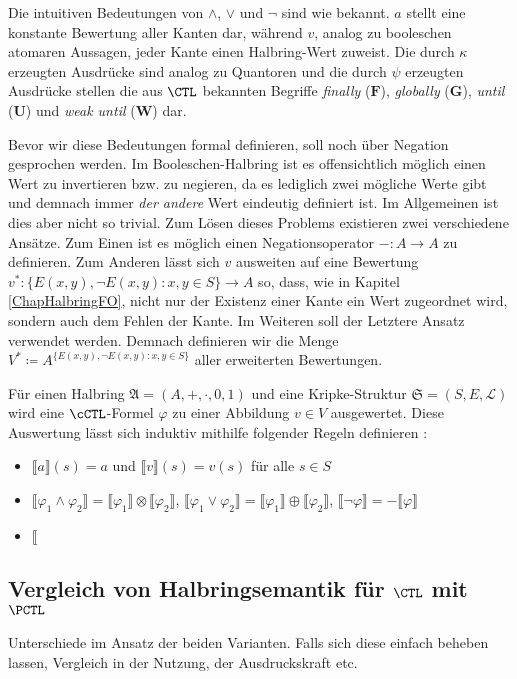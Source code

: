 Die intuitiven Bedeutungen von $\land$, $\lor$ und $\neg$ sind wie bekannt.
$a$ stellt eine konstante Bewertung aller Kanten dar, während $v$, analog zu booleschen atomaren Aussagen, jeder Kante einen Halbring-Wert zuweist.
Die durch $\kappa$ erzeugten Ausdrücke sind analog zu Quantoren und die durch $\psi$ erzeugten Ausdrücke stellen die aus $\CTL$ bekannten Begriffe \textit{finally} ($\boldsymbol{F}$), \textit{globally} ($\boldsymbol{G}$), \textit{until} ($\boldsymbol{U}$) und \textit{weak until} ($\boldsymbol{W}$) dar.

Bevor wir diese Bedeutungen formal definieren, soll noch über Negation gesprochen werden.
Im Booleschen-Halbring ist es offensichtlich möglich einen Wert zu invertieren bzw. zu negieren, da es lediglich zwei mögliche Werte gibt und demnach immer \textit{der andere} Wert eindeutig definiert ist.
Im Allgemeinen ist dies aber nicht so trivial. Zum Lösen dieses Problems existieren zwei verschiedene Ansätze. 
Zum Einen ist es möglich einen Negationsoperator $-:A\to A$ zu definieren. 
Zum Anderen lässt sich $v$ ausweiten auf eine Bewertung $v^*:\{E(x,y), \neg E(x,y) : x,y\in S\}\to A$ so, dass, wie in Kapitel \ref{ChapHalbringFO}, nicht nur der Existenz einer Kante ein Wert zugeordnet wird, sondern auch dem Fehlen der Kante.
Im Weiteren soll der Letztere Ansatz verwendet werden.
Demnach definieren wir die Menge $V^*\coloneqq A^{\{E(x,y), \neg E(x,y) : x,y\in S\}}$ aller erweiterten Bewertungen.

\begin{definition}
	Für einen Halbring $\mathfrak{A}=(A,+,\cdot,0,1)$ und eine Kripke-Struktur $\mathfrak{S}=(S,E,\mathcal{L})$ wird eine $\cCTL$-Formel $\varphi$ zu einer Abbildung $v\in V$ ausgewertet.
	Diese Auswertung lässt sich induktiv mithilfe folgender Regeln definieren \cite{lluch2005quantitative}:
	\begin{itemize}
		\item $\llbracket a \rrbracket(s) = a$ und $\llbracket v \rrbracket(s) = v(s)$ für alle $s\in S$
		\item $\llbracket \varphi_1 \land \varphi_2 \rrbracket = \llbracket\varphi_1\rrbracket \otimes \llbracket\varphi_2\rrbracket$, $\llbracket \varphi_1\lor\varphi_2 \rrbracket = \llbracket \varphi_1\rrbracket \oplus \llbracket \varphi_2\rrbracket$, $\llbracket \neg \varphi \rrbracket = -\llbracket \varphi \rrbracket$
		\item $\llbracket $
	\end{itemize}
\end{definition}



\subsection{Vergleich von Halbringsemantik für $\CTL$ mit $\PCTL$}

Unterschiede im Ansatz der beiden Varianten. Falls sich diese einfach beheben lassen, Vergleich in der Nutzung, der Ausdruckskraft etc.